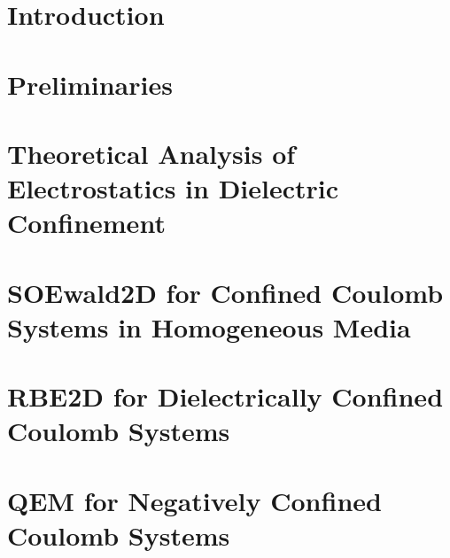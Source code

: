 \documentclass[a4paper]{ustthesis}
\begin{document}


\chapter{Introduction}
\label{chp_intro}

\newpage

\chapter{Preliminaries}
\label{chp_preliminaries}

\newpage

\chapter{Theoretical Analysis of Electrostatics in Dielectric Confinement}
\label{chp_icmewald2d}

\newpage

\chapter{SOEwald2D for Confined Coulomb Systems in Homogeneous Media}
\label{chp_soewald2d}

\newpage

\chapter{RBE2D for Dielectrically Confined Coulomb Systems}
\label{chp_rbe2d}

\newpage

\chapter{QEM for Negatively Confined Coulomb Systems}
\label{chp_quasiewald}

\newpage
\end{document}
